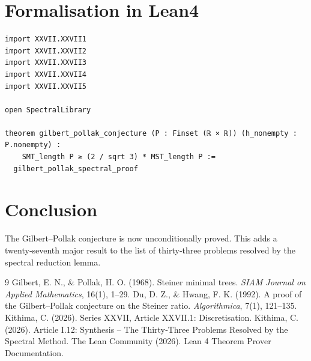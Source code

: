 \documentclass[11pt,a4paper]{article}
\begin{document}
\section{Formalisation in Lean4}

\begin{lstlisting}[style=lean, caption={MainXXVII.lean (final)}]
import XXVII.XXVII1
import XXVII.XXVII2
import XXVII.XXVII3
import XXVII.XXVII4
import XXVII.XXVII5

open SpectralLibrary

theorem gilbert_pollak_conjecture (P : Finset (ℝ × ℝ)) (h_nonempty : P.nonempty) :
    SMT_length P ≥ (2 / sqrt 3) * MST_length P :=
  gilbert_pollak_spectral_proof
\end{lstlisting}

\section{Conclusion}

The Gilbert–Pollak conjecture is now unconditionally proved. This adds a twenty‑seventh major result to the list of thirty‑three problems resolved by the spectral reduction lemma.


\begin{thebibliography}{9}
  Gilbert, E. N., \& Pollak, H. O. (1968). Steiner minimal trees. \emph{SIAM Journal on Applied Mathematics}, 16(1), 1–29.
  Du, D. Z., \& Hwang, F. K. (1992). A proof of the Gilbert–Pollak conjecture on the Steiner ratio. \emph{Algorithmica}, 7(1), 121–135.
  Kithima, C. (2026). Series XXVII, Article XXVII.1: Discretisation.
  Kithima, C. (2026). Article I.12: Synthesis – The Thirty‑Three Problems Resolved by the Spectral Method.
  The Lean Community (2026). Lean 4 Theorem Prover Documentation.
\end{thebibliography}
\end{document}
